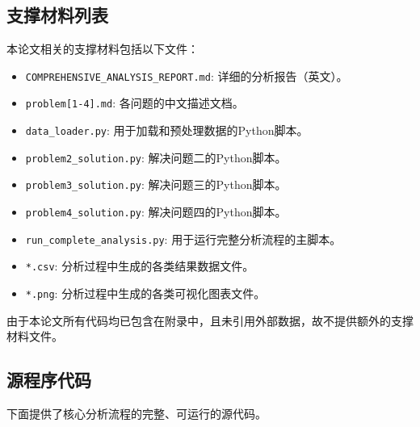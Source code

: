 \documentclass[UTF8, a4paper, 11pt]{ctexart}
\begin{document}
\subsection{支撑材料列表}
本论文相关的支撑材料包括以下文件：
\begin{itemize}
    \item \texttt{COMPREHENSIVE\_ANALYSIS\_REPORT.md}: 详细的分析报告（英文）。
    \item \texttt{problem[1-4].md}: 各问题的中文描述文档。
    \item \texttt{data\_loader.py}: 用于加载和预处理数据的Python脚本。
    \item \texttt{problem2\_solution.py}: 解决问题二的Python脚本。
    \item \texttt{problem3\_solution.py}: 解决问题三的Python脚本。
    \item \texttt{problem4\_solution.py}: 解决问题四的Python脚本。
    \item \texttt{run\_complete\_analysis.py}: 用于运行完整分析流程的主脚本。
    \item \texttt{*.csv}: 分析过程中生成的各类结果数据文件。
    \item \texttt{*.png}: 分析过程中生成的各类可视化图表文件。
\end{itemize}
由于本论文所有代码均已包含在附录中，且未引用外部数据，故不提供额外的支撑材料文件。

\subsection{源程序代码}
下面提供了核心分析流程的完整、可运行的源代码。
\end{document}

